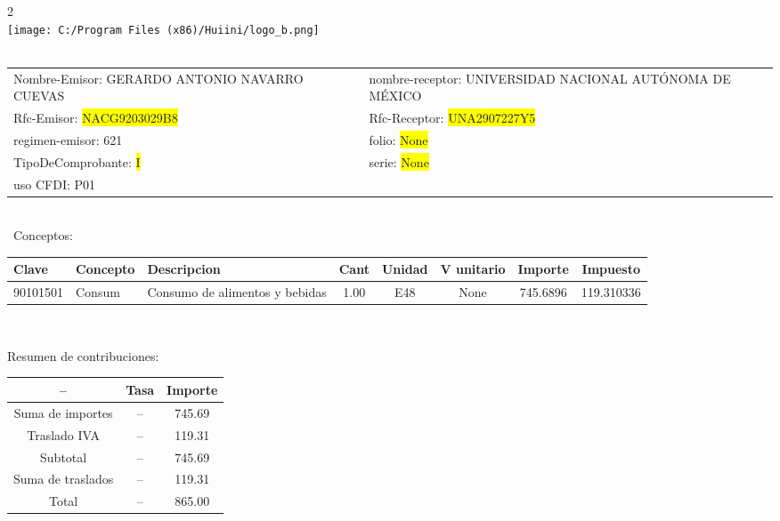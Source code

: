 \documentclass{article}
\begin{document}
\hspace{18cm} 2\\
\texttt{[image: C:/Program Files (x86)/Huiini/logo\_b.png]}
\bigskip\\\
\begin{tabular}{p{11cm}p{1cm}p{8cm}}

Nombre-Emisor: GERARDO ANTONIO NAVARRO CUEVAS && nombre-receptor: UNIVERSIDAD NACIONAL AUTÓNOMA DE MÉXICO\\

Rfc-Emisor: \colorbox{yellow}{ NACG9203029B8 } & & Rfc-Receptor: \colorbox{yellow}{ UNA2907227Y5 }\\

regimen-emisor: 621 & & folio: \colorbox{yellow}{ None }\\

TipoDeComprobante: \colorbox{yellow}{ I } & & serie: \colorbox{yellow}{ None }\\

uso CFDI: P01\\



\end{tabular}
\bigskip\bigskip\bigskip\\\
Conceptos:\\
\begin{tabular}{|p{1.5cm}|p{3.6cm}|p{3.6cm}|c|c|c|c|c|}
\hline
Clave & Concepto & Descripcion & Cant & Unidad & V unitario & Importe & Impuesto \\
\hline

90101501 & Consum & Consumo de alimentos y bebidas & 1.00 & E48 & None & 745.6896 &  119.310336 \\
\hline

\end{tabular}\\
\bigskip
\begin{center}
Resumen de contribuciones:\\
\bigskip
\begin{tabular}{|c|c|c|}
\hline
 -- & Tasa & Importe\\
\hline

Suma de importes & -- & 745.69 \\
\hline

Traslado IVA & -- & 119.31 \\
\hline

Subtotal  & -- & 745.69 \\
\hline

Suma de traslados & -- & 119.31 \\
\hline

Total  & -- & 865.00 \\
\hline

\end{tabular}
\end{center}
\end{document}
